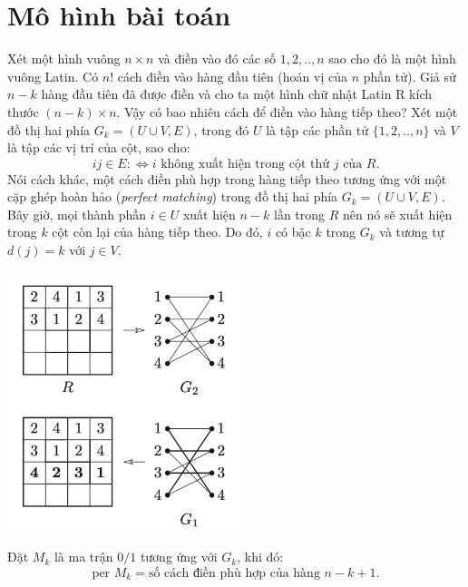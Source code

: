 \documentclass[a4paper, 12pt]{report}
\begin{document}
\section{Mô hình bài toán}
Xét một hình vuông $n \times n$ và điền vào đó các số $1,2,..,n$ sao cho đó là một hình vuông Latin. Có $n!$ cách điền vào hàng đầu tiên (hoán vị của $n$ phần tử). Giả sử $n-k$ hàng đầu tiên đã được điền và cho ta một hình chữ nhật Latin R kích thước $(n-k) \times n$. Vậy có bao nhiêu cách để điền vào hàng tiếp theo? Xét một đồ thị hai phía $G_k = (U \cup V,E)$, trong đó $U$ là tập các phần tử $\{1,2,..,n\}$ và $V$ là tập các vị trí của cột, sao cho:
\begin{equation*}
ij \in E :\Leftrightarrow i \textrm{ không xuất hiện trong cột thứ } j \textrm{ của } R.
\end{equation*}
Nói cách khác, một cách điền phù hợp trong hàng tiếp theo tương ứng với một cặp ghép hoàn hảo (\textit{perfect matching}) trong đồ thị hai phía $G_k = (U \cup V,E)$. Bây giờ, mọi thành phần $i \in U$ xuất hiện $n-k$ lần trong $R$ nên nó sẽ xuất hiện trong $k$ cột còn lại của hàng tiếp theo. Do đó, $i$ có bậc $k$ trong $G_k$ và tương tự $d(j) = k $ với $j \in V$. \\
\begin{center}
	\includegraphics[width=7cm]{ex3}
\end{center}
Đặt $M_k$ là ma trận $0/1$ tương ứng với $G_k$, khi đó:
\begin{equation*}
	\textrm{per } M_k = \textrm{số cách điền phù hợp của hàng } n-k+1.
\end{equation*}
\end{document}
